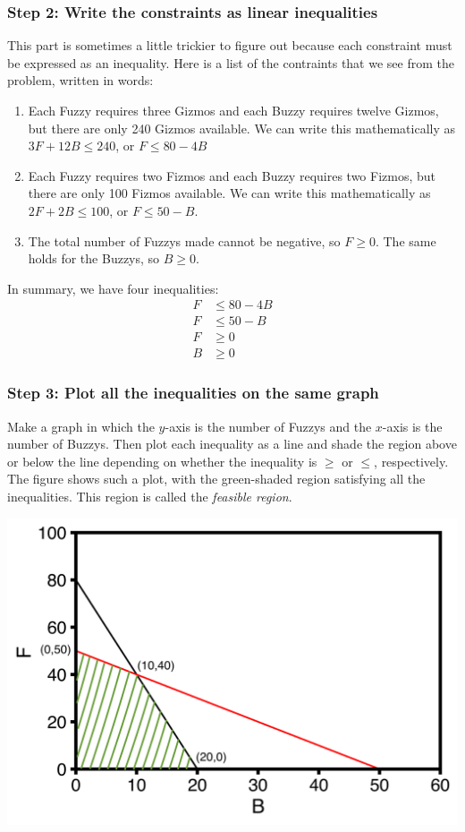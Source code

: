 \documentclass{article}
\begin{document}
\subsubsection*{Step 2: Write the constraints as linear inequalities}
This part is sometimes a little trickier to figure out because each constraint must
be expressed as an inequality.
Here is a list of the contraints that we see from the problem, written in words:
\begin{enumerate}
     \item Each Fuzzy requires three Gizmos and each Buzzy requires twelve
         Gizmos, but there are only 240 Gizmos available.  We can write this
         mathematically as $3F + 12 B \le 240$, or $F \le 80 - 4B$
     \item Each Fuzzy requires two Fizmos and each Buzzy requires two
         Fizmos, but there are only 100 Fizmos available.  We can write this
         mathematically as $2F + 2B \le 100$, or $F \le 50 - B$.
      \item The total number of Fuzzys made cannot be negative, so $F \ge 0$.
         The same holds for the Buzzys, so $B \ge 0$.
\end{enumerate}
In summary, we have four inequalities:
\begin{align}
F &\le 80 - 4 B \\
F &\le 50 - B \\ 
F &\ge 0 \\
B &\ge 0 
\end{align}

\subsubsection*{Step 3: Plot all the inequalities on the same graph}
Make a graph in which the $y$-axis is the number of Fuzzys and the $x$-axis
is the number of Buzzys.  Then plot each inequality as a line and shade the
region above or below the line depending on whether the inequality is
$\ge$ or $\le$, respectively.  The figure shows such a plot, with the
green-shaded region satisfying all the inequalities.  This region is
called the \textit{feasible region}.

\begin{center}
    \includegraphics[scale=0.6]{FuzzyBuzzy.png}
\end{center}
\end{document}
